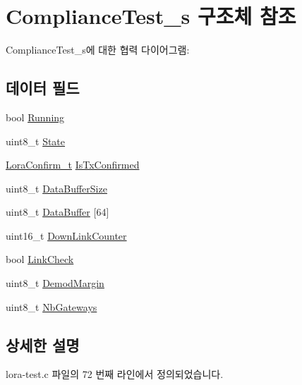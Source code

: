 \hypertarget{struct_compliance_test__s}{}\section{Compliance\+Test\+\_\+s 구조체 참조}
\label{struct_compliance_test__s}


Compliance\+Test\+\_\+s에 대한 협력 다이어그램\+:
\subsection*{데이터 필드}
\begin{DoxyCompactItemize}
\item 
bool \mbox{\hyperlink{struct_compliance_test__s_ae2e97f1ebd7c956e2c68d1209eabd4b1}{Running}}
\item 
uint8\+\_\+t \mbox{\hyperlink{struct_compliance_test__s_a9ac4c1f881137da2601ed5d333bb5989}{State}}
\item 
\mbox{\hyperlink{lora_8h_abb50b325793cb04a67bdef9c8c198c20}{Lora\+Confirm\+\_\+t}} \mbox{\hyperlink{struct_compliance_test__s_aeeb75e9eb8da494fe7cbf16abf51427a}{Is\+Tx\+Confirmed}}
\item 
uint8\+\_\+t \mbox{\hyperlink{struct_compliance_test__s_a0d291179d144227d52882be5e1d67832}{Data\+Buffer\+Size}}
\item 
uint8\+\_\+t \mbox{\hyperlink{struct_compliance_test__s_a506f79cac5e441df28fe82e76dbbc932}{Data\+Buffer}} \mbox{[}64\mbox{]}
\item 
uint16\+\_\+t \mbox{\hyperlink{struct_compliance_test__s_a76fae6cae1874b9700238a561ef49305}{Down\+Link\+Counter}}
\item 
bool \mbox{\hyperlink{struct_compliance_test__s_adeaa3c79dc995e74f45bffef6c768edb}{Link\+Check}}
\item 
uint8\+\_\+t \mbox{\hyperlink{struct_compliance_test__s_a60502ba4c33cf0435f086a1a9f1b5116}{Demod\+Margin}}
\item 
uint8\+\_\+t \mbox{\hyperlink{struct_compliance_test__s_ac2fbb4be8e3cc46943038a1796010d71}{Nb\+Gateways}}
\end{DoxyCompactItemize}


\subsection{상세한 설명}


lora-\/test.\+c 파일의 72 번째 라인에서 정의되었습니다.



